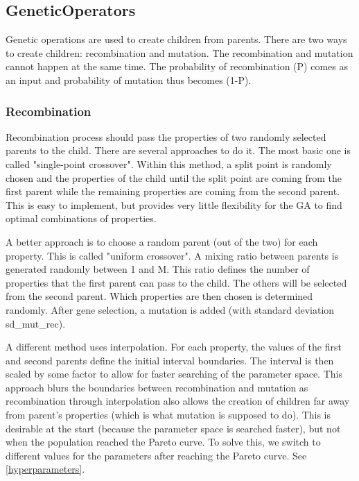 \subsection{GeneticOperators} \label{geneticOperators}

Genetic operations are used to create children from parents. There are two ways to create children: recombination and mutation. The recombination and mutation cannot happen at the same time. The probability of recombination (P) comes as an input and probability of mutation thus becomes (1-P).

\subsubsection{Recombination}

Recombination process should pass the properties of two randomly selected parents to the child. There are several approaches to do it. The most basic one is called "single-point crossover". Within this method, a split point is randomly chosen and the properties of the child until the split point are coming from the first parent while the remaining properties are coming from the second parent. This is easy to implement, but provides very little flexibility for the GA to find optimal combinations of properties. %

A better approach is to choose a random parent (out of the two) for each property. This is called "uniform crossover". A mixing ratio between parents is generated randomly between 1 and M. This ratio defines the number of properties that the first parent can pass to the child. The others will be selected from the second parent. Which properties are then chosen is determined randomly. After gene selection, a mutation is added (with standard deviation sd_mut_rec).

A different method uses interpolation. For each property, the values of the first and second parents define the initial interval boundaries. The interval is then scaled by some factor to allow for faster searching of the parameter space. 
This approach blurs the boundaries between recombination and mutation as recombination through interpolation also allows the creation of children far away from parent's properties (which is what mutation is supposed to do). This is desirable at the start (because the parameter space is searched faster), but not when the population reached the Pareto curve. To solve this, we switch to different values for the parameters after reaching the Pareto curve. See \cref{hyperparameters}.

